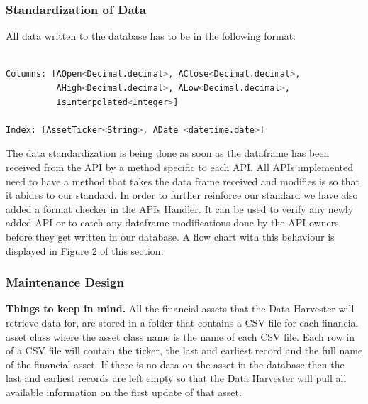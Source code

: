 \documentclass[main.tex]{subfiles}
\begin{document}
\subsubsection{Standardization of Data}
All data written to the database has to be in the following format:
\begin{lstlisting}[language=Python, caption= Pandas Data Frame Format , label=lst:Development_env]

Columns: [AOpen<Decimal.decimal>, AClose<Decimal.decimal>,
          AHigh<Decimal.decimal>, ALow<Decimal.decimal>,
          IsInterpolated<Integer>] 
          
Index: [AssetTicker<String>, ADate <datetime.date>]
\end{lstlisting}

The data standardization is being done as soon as the dataframe has been received from the API by a method specific to each API. All APIs implemented need to have a method that takes the data frame received and modifies is so that it abides to our standard. In order to further reinforce our standard we have also added a format checker in the APIs Handler. It can be used to verify any newly added API or to catch any dataframe modifications done by the API owners before they get written in our database.  A flow chart with this behaviour is displayed in Figure 2 of this section. 


\subsubsection{Maintenance Design}
\textbf{Things to keep in mind.\newline}
All the financial assets that the Data Harvester will retrieve data for, are stored in a folder that contains a CSV file for each financial asset class where the asset class name is the name of each CSV file. Each row in of a CSV file will contain the ticker, the last and earliest record and the full name of the financial asset. If there is no data on the asset in the database then the last and earliest records are left empty so that the Data Harvester will pull all available information on the first update of that asset.\newline
\end{document}
